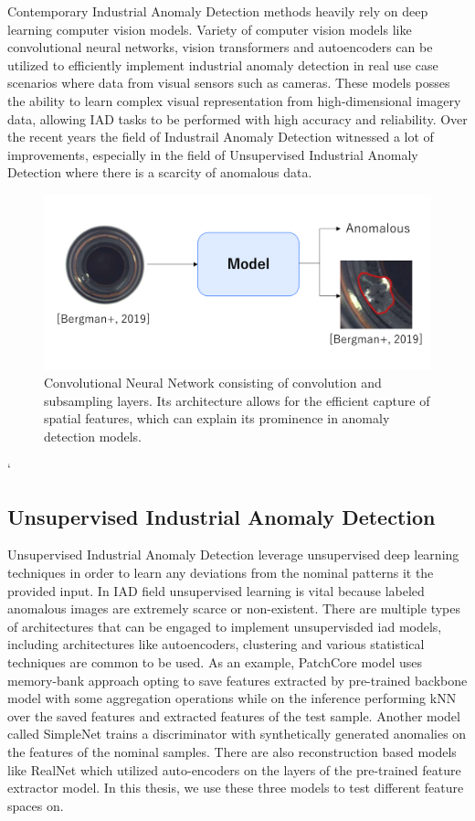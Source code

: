 Contemporary Industrial Anomaly Detection methods heavily rely on deep learning computer vision models. Variety of computer vision models like convolutional neural networks, vision transformers and autoencoders can be utilized to efficiently implement industrial anomaly detection in real use case scenarios where data from visual sensors such as cameras. These models posses the ability to learn complex visual representation from high-dimensional imagery data, allowing IAD tasks to be performed with high accuracy and reliability. Over the recent years the field of Industrail Anomaly Detection witnessed a lot of improvements, especially in the field of Unsupervised Industrial Anomaly Detection where there is a scarcity of anomalous data. 

\begin{figure}[t]
	\begin{center}
		\includegraphics[width=1.0\linewidth]{Chapter_2/iad.png}
	\end{center}
	\caption{Convolutional Neural Network consisting of convolution and subsampling layers. Its architecture allows for the efficient capture of spatial features, which can explain its prominence in anomaly detection models.}
	\label{fig:cnn}
\end{figure}
`
\subsection{Unsupervised Industrial Anomaly Detection}
\label{unsupervised iad}

Unsupervised Industrial Anomaly Detection leverage unsupervised deep learning techniques in order to learn any deviations from the nominal patterns it the provided input. In IAD field unsupervised learning is vital because labeled anomalous images are extremely scarce or non-existent. There are multiple types of architectures that can be engaged to implement unsupervisded iad models, including architectures like autoencoders, clustering and various statistical techniques are common to be used. As an example, PatchCore model uses memory-bank approach opting to save features extracted by pre-trained backbone model with some aggregation operations while on the inference performing kNN over the saved features and extracted features of the test sample. Another model called SimpleNet trains a discriminator with synthetically generated anomalies on the features of the nominal samples. There are also reconstruction based models like RealNet which utilized auto-encoders on the layers of the pre-trained feature extractor model. In this thesis, we use these three models to test different feature spaces on.

